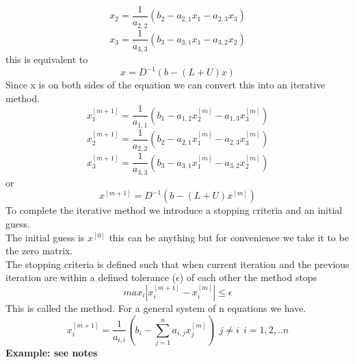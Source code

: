 \[x_2 = \frac{1}{a_{2,2}}(b_2 - a_{2,1}x_1 -a_{2,3}x_3) \]
\[x_3 = \frac{1}{a_{3,3}}(b_3 - a_{3,1}x_1 -a_{3,2}x_2) \]
this is equivalent to
\[ x=D^{-1}(b-(L+U)x) \]
Since x is on both sides of the equation we can convert this into an iterative method.
\[x_1^{[m+1]} = \frac{1}{a_{1,1}}(b_1 - a_{1,2}x_2^{[m]} -a_{1,3}x_3^{[m]}) \]
\[x_2^{[m+1]} = \frac{1}{a_{2,2}}(b_2 - a_{2,1}x_1^{[m]} -a_{2,3}x_3^{[m]}) \]
\[x_3^{[m+1]} = \frac{1}{a_{3,3}}(b_3 - a_{3,1}x_1^{[m]} -a_{3,2}x_2^{[m]}) \]
or
\[ x^{[m+1]}=D^{-1}(b-(L+U)x^{[m]}) \]
To complete the iterative method we introduce a stopping criteria and an initial guess.\\
The initial guess is $x^{[0]}$ this can be anything but for convenience we take it to be the 
zero matrix.\\
The stopping criteria is defined such that when current iteration and the previous iteration
are within a defined tolerance ($\epsilon$) of each other the method stops
\[ max_{i}|x_{i}^{[m+1]}-x_{i}^{[m]}|\leq \epsilon \]
This is called the  method.  For a general system of n equations we have.
\[ x_i^{[m+1]}=\frac{1}{a_{i,i}}(b_i-\sum_{j=1}^{n}a_{i,j}x_{j}^{[m]}) \ \ j\not=i \ \ i = 1,2,..n\]
\textbf{Example: see notes}
